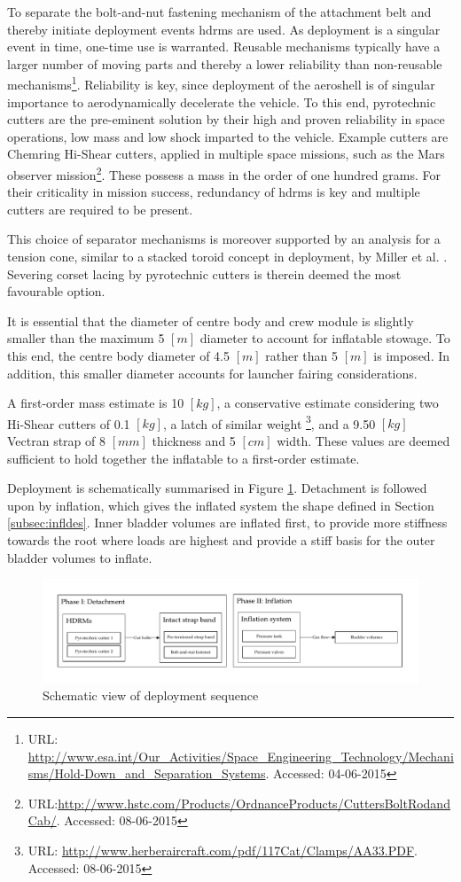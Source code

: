 To separate the bolt-and-nut fastening mechanism of the attachment belt and thereby initiate deployment events \glspl{hdrm} are used. As deployment is a singular event in time, one-time use is warranted. Reusable mechanisms typically have a larger number of moving parts and thereby a lower reliability than non-reusable mechanisms\footnote{URL: \url{http://www.esa.int/Our_Activities/Space_Engineering_Technology/Mechanisms/Hold-Down_and_Separation_Systems}. Accessed: 04-06-2015}. Reliability is key, since deployment of the aeroshell is of singular importance to aerodynamically decelerate the vehicle. To this end, pyrotechnic cutters are the pre-eminent solution by their high and proven reliability in space operations, low mass and low shock imparted to the vehicle. Example cutters are Chemring Hi-Shear cutters, applied in multiple space missions, such as the Mars observer mission\footnote{URL:\url{http://www.hstc.com/Products/OrdnanceProducts/CuttersBoltRodandCab/}. Accessed: 08-06-2015}. These possess a mass in the order of one hundred grams. For their criticality in mission success, redundancy of \glspl{hdrm} is key and multiple cutters are required to be present. 

This choice of separator mechanisms is moreover supported by an analysis for a tension cone, similar to a stacked toroid concept in deployment, by Miller et al. \cite{Miller2014}. Severing corset lacing by pyrotechnic cutters is therein deemed the most favourable option.


It is essential that the diameter of centre body and crew module is slightly smaller than the maximum 5 $[m]$ diameter to account for inflatable stowage. To this end, the centre body diameter of 4.5 $[m]$ rather than 5 $[m]$ is imposed. In addition, this smaller diameter accounts for launcher fairing considerations.


A first-order mass estimate is 10 $[kg]$, a conservative estimate considering two Hi-Shear cutters of 0.1 $[kg]$, a latch of similar weight \footnote{URL: \url{http://www.herberaircraft.com/pdf/117Cat/Clamps/AA33.PDF}. Accessed: 08-06-2015}, and a 9.50 $[kg]$ Vectran strap of 8 $[mm]$ thickness and 5 $[cm]$ width. These values are deemed sufficient to hold together the inflatable to a first-order estimate.

Deployment is schematically summarised in Figure \ref{fig:deplflow}. Detachment is followed upon by inflation, which gives the inflated system the shape defined in Section \ref{subsec:infldes}. Inner bladder volumes are inflated first, to provide more stiffness towards the root where loads are highest and provide a stiff basis for the outer bladder volumes to inflate.

\begin{figure}[ht]
		\centering
		\includegraphics[width=1.0\textwidth]{./Figure/Structure/Deployment.pdf}
		\caption{Schematic view of deployment sequence}
		\label{fig:deplflow}
\end{figure}






